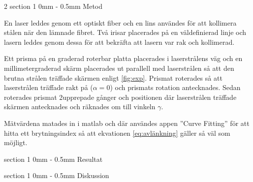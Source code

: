 \documentclass[a4paper]{article}
\makeatletter
\renewcommand{\section}{\@startsection
{section}%
{1}%
{0mm}%
{-\baselineskip}%
{0.5mm}%
{\normalfont\bfseries}} %
\makeatother
\begin{document}
\begin{multicols}{2}
  \section{Metod}
  
  
  En laser leddes genom ett optiskt fiber och en lins användes för att kollimera stålen när den lämnade fibret. Två irisar placerades på en väldefinierad linje och lasern leddes genom dessa för att bekräfta att lasern var rak och kollimerad.
  
  Ett prisma på en graderad roterbar platta placerades i laserstrålens väg och en millimetergraderad skärm placerades ut parallell med laserstrålen så att den brutna strålen träffade skärmen enligt \autoref{fig:exp}. Prismat roterades så att laserstrålen träffade rakt på ($\alpha=0$) och prismats rotation antecknades. Sedan roterades prismat 2\textdegree upprepade gånger och positionen där laserstrålen träffade skärmen antecknades och räknades om till vinkeln $\gamma$.
  
  Mätvärdena matades in i matlab och där användes appen ”Curve Fitting” för att hitta ett brytningsindex så att ekvationen \eqref{eq:avlänkning} gäller så väl som möjligt.

  \section{Resultat}


  \section{Diskussion}


\end{multicols}
\end{document}
